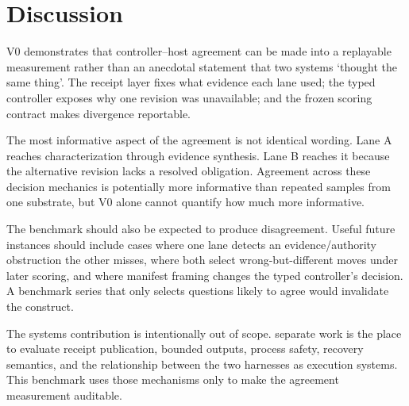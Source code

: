 \section{Discussion}

V0 demonstrates that controller--host agreement can be made into a replayable measurement rather than an anecdotal statement that two systems `thought the same thing'. The receipt layer fixes what evidence each lane used; the typed controller exposes why one revision was unavailable; and the frozen scoring contract makes divergence reportable.

The most informative aspect of the agreement is not identical wording. Lane A reaches characterization through evidence synthesis. Lane B reaches it because the alternative revision lacks a resolved obligation. Agreement across these decision mechanics is potentially more informative than repeated samples from one substrate, but V0 alone cannot quantify how much more informative.

The benchmark should also be expected to produce disagreement. Useful future instances should include cases where one lane detects an evidence/authority obstruction the other misses, where both select wrong-but-different moves under later scoring, and where manifest framing changes the typed controller's decision. A benchmark series that only selects questions likely to agree would invalidate the construct.

The systems contribution is intentionally out of scope. separate work is the place to evaluate receipt publication, bounded outputs, process safety, recovery semantics, and the relationship between the two harnesses as execution systems. This benchmark uses those mechanisms only to make the agreement measurement auditable.